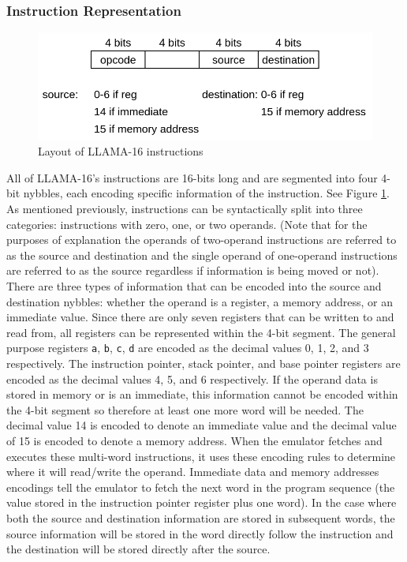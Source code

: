 \documentclass[man,hidelinks,floatsintext]{apa7}
\begin{document}
\subsubsection{Instruction Representation}
\begin{figure}[h]
  \centering
  \captionsetup{justification=centering}
  \includegraphics[width=.75\textwidth]{instrformat}
  \vspace*{3mm}
  \caption{Layout of LLAMA-16 instructions}
  \label{fig:instrformat}
\end{figure}
All of LLAMA-16's instructions are 16-bits long and are segmented into four 4-bit nybbles, each encoding specific information of the instruction. See Figure \ref{fig:instrformat}. As mentioned previously, instructions can be syntactically split into three categories: instructions with zero, one, or two operands. (Note that for the purposes of explanation the operands of two-operand instructions are referred to as the source and destination and the single operand of one-operand instructions are referred to as the source regardless if information is being moved or not). There are three types of information that can be encoded into the source and destination nybbles: whether the operand is a register, a memory address, or an immediate value. Since there are only seven registers that can be written to and read from, all registers can be represented within the 4-bit segment. The general purpose registers \verb|a|, \verb|b|, \verb|c|, \verb|d| are encoded as the decimal values 0, 1, 2, and 3 respectively. The instruction pointer, stack pointer, and base pointer registers are encoded as the decimal values 4, 5, and 6 respectively. If the operand data is stored in memory or is an immediate, this information cannot be encoded within the 4-bit segment so therefore at least one more word will be needed. The decimal value 14 is encoded to denote an immediate value and the decimal value of 15 is encoded to denote a memory address. When the emulator fetches and executes these multi-word instructions, it uses these encoding rules to determine where it will read/write the operand. Immediate data and memory addresses encodings tell the emulator to fetch the next word in the program sequence (the value stored in the instruction pointer register plus one word). In the case where both the source and destination information are stored in subsequent words, the source information will be stored in the word directly follow the instruction and the destination will be stored directly after the source.
\end{document}
